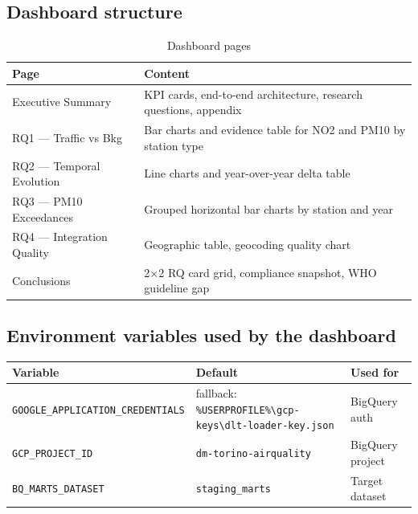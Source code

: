 \documentclass[11pt,a4paper]{article}
\begin{document}
\subsection{Dashboard structure}

\begin{table}[h!]
\centering
\caption{Dashboard pages}
\small
{}
\begin{tabularx}{\textwidth}{@{}lX@{}}
\toprule
\textbf{Page} & \textbf{Content} \\
\midrule
Executive Summary         & KPI cards, end-to-end architecture, research questions, appendix \\
RQ1 — Traffic vs Bkg     & Bar charts and evidence table for NO2 and PM10 by station type \\
RQ2 — Temporal Evolution & Line charts and year-over-year delta table \\
RQ3 — PM10 Exceedances   & Grouped horizontal bar charts by station and year \\
RQ4 — Integration Quality & Geographic table, geocoding quality chart \\
Conclusions              & 2×2 RQ card grid, compliance snapshot, WHO guideline gap \\
\bottomrule
\end{tabularx}
\end{table}

\subsection{Environment variables used by the dashboard}

\begin{table}[h!]
\centering\small
{}
\begin{tabular}{@{}lll@{}}
\toprule
\textbf{Variable} & \textbf{Default} & \textbf{Used for} \\
\midrule
\texttt{GOOGLE\_APPLICATION\_CREDENTIALS} & fallback: \texttt{\%USERPROFILE\%\textbackslash gcp-keys\textbackslash dlt-loader-key.json} & BigQuery auth \\
\texttt{GCP\_PROJECT\_ID}                 & \texttt{dm-torino-airquality} & BigQuery project \\
\texttt{BQ\_MARTS\_DATASET}               & \texttt{staging\_marts}       & Target dataset \\
\bottomrule
\end{tabular}
\end{table}
\end{document}
